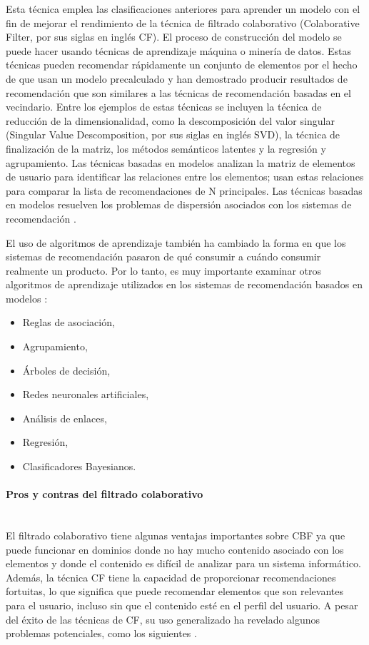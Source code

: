 Esta técnica emplea las clasificaciones anteriores para aprender un modelo con el fin de mejorar el rendimiento de la técnica de filtrado colaborativo (Colaborative Filter, por sus siglas en inglés CF). El proceso de construcción del modelo se puede hacer usando técnicas de aprendizaje máquina o minería de datos. Estas técnicas pueden recomendar rápidamente un conjunto de elementos por el hecho de que usan un modelo precalculado y han demostrado producir resultados de recomendación que son similares a las técnicas de recomendación basadas en el vecindario. Entre los ejemplos de estas técnicas se incluyen la técnica de reducción de la dimensionalidad, como la descomposición del valor singular (Singular Value Descomposition, por sus siglas en inglés SVD), la técnica de finalización de la matriz, los métodos semánticos latentes y la regresión y agrupamiento. Las técnicas basadas en modelos analizan la matriz de elementos de usuario para identificar las relaciones entre los elementos; usan estas relaciones para comparar la lista de recomendaciones de N principales. Las técnicas basadas en modelos resuelven los problemas de dispersión asociados con los sistemas de recomendación \cite{Isinkaye}.
\\ \par
El uso de algoritmos de aprendizaje también ha cambiado la forma en que los sistemas de recomendación pasaron de qué consumir a cuándo consumir realmente un producto. Por lo tanto, es muy importante examinar otros algoritmos de aprendizaje utilizados en los sistemas de recomendación basados en modelos \cite{Isinkaye}:
\begin{itemize}
\item Reglas de asociación,
\item Agrupamiento,
\item Árboles de decisión,
\item Redes neuronales artificiales,
\item Análisis de enlaces,
\item Regresión,
\item Clasificadores Bayesianos.
\end{itemize}

\paragraph{Pros y contras del filtrado colaborativo} ~\\

El filtrado colaborativo tiene algunas ventajas importantes sobre CBF ya que puede funcionar en dominios donde no hay mucho contenido asociado con los elementos y donde el contenido es difícil de analizar para un sistema informático. Además, la técnica CF tiene la capacidad de proporcionar recomendaciones fortuitas, lo que significa que puede recomendar elementos que son relevantes para el usuario, incluso sin que el contenido esté en el perfil del usuario. A pesar del éxito de las técnicas de CF, su uso generalizado ha revelado algunos problemas potenciales, como los siguientes \cite{Isinkaye}.

